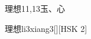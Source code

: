 \begin{entry}{理想}{11,13}{⽟、⼼}
  \begin{phonetics}{理想}{li3xiang3}[][HSK 2]
  \end{phonetics}
\end{entry}
